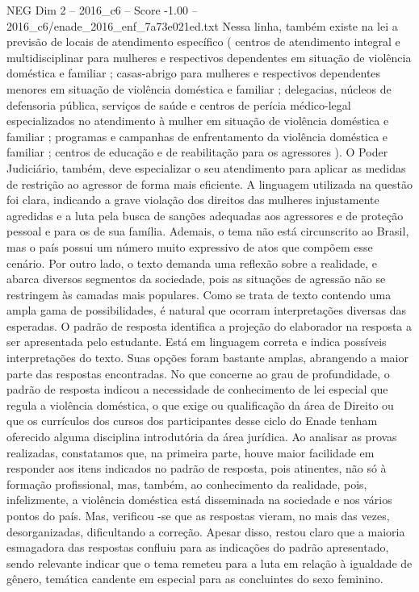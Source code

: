 \begin{textsample}{NEG Dim 2 – 2016\_c6 – Score -1.00 – 2016\_c6/enade\_2016\_enf\_7a73e021ed.txt}
Nessa linha, também existe na lei a previsão de locais de atendimento específico ( centros de atendimento integral e multidisciplinar para mulheres e respectivos dependentes em situação de violência doméstica e familiar ; casas-abrigo para mulheres e respectivos dependentes menores em situação de violência doméstica e familiar ; delegacias, núcleos de defensoria pública, serviços de saúde e centros de perícia médico-legal especializados no atendimento à mulher em situação de violência doméstica e familiar ; programas e campanhas de enfrentamento da violência doméstica e familiar ; centros de educação e de reabilitação para os agressores ).
O Poder Judiciário, também, deve especializar o seu atendimento para aplicar as medidas de restrição ao agressor de forma mais eficiente.
A linguagem utilizada na questão foi clara, indicando a grave violação dos direitos das mulheres injustamente agredidas e a luta pela busca de sanções adequadas aos agressores e de proteção pessoal e para os de sua família.
Ademais, o tema não está circunscrito ao Brasil, mas o país possui um número muito expressivo de atos que compõem esse cenário.
Por outro lado, o texto demanda uma reflexão sobre a realidade, e abarca diversos segmentos da sociedade, pois as situações de agressão não se restringem às camadas mais populares.
Como se trata de texto contendo uma ampla gama de possibilidades, é natural que ocorram interpretações diversas das esperadas.
O padrão de resposta identifica a projeção do elaborador na resposta a ser apresentada pelo estudante.
Está em linguagem correta e indica possíveis interpretações do texto.
Suas opções foram bastante amplas, abrangendo a maior parte das respostas encontradas.
No que concerne ao grau de profundidade, o padrão de resposta indicou a necessidade de conhecimento de lei especial que regula a violência doméstica, o que exige ou qualificação da área de Direito ou que os currículos dos cursos dos participantes desse ciclo do Enade tenham oferecido alguma disciplina introdutória da área jurídica.
Ao analisar as provas realizadas, constatamos que, na primeira parte, houve maior facilidade em responder aos itens indicados no padrão de resposta, pois atinentes, não só à formação profissional, mas, também, ao conhecimento da realidade, pois, infelizmente, a violência doméstica está disseminada na sociedade e nos vários pontos do país.
Mas, verificou -se que as respostas vieram, no mais das vezes, desorganizadas, dificultando a correção.
Apesar disso, restou claro que a maioria esmagadora das respostas confluiu para as indicações do padrão apresentado, sendo relevante indicar que o tema remeteu para a luta em relação à igualdade de gênero, temática candente em especial para as concluintes do sexo feminino.

\end{textsample}
